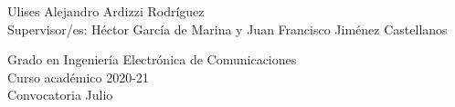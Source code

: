 \begin{center}
   \vspace{1.2cm}

  Ulises Alejandro Ardizzi Rodríguez\\

   \vspace{1.2cm}
  Supervisor/es: Héctor García de Marina y Juan Francisco Jiménez Castellanos
  
  \vspace{2cm}
  Grado en Ingeniería Electrónica de Comunicaciones\\
  Curso académico 2020-21\\
  Convocatoria Julio\\



\end{center}




